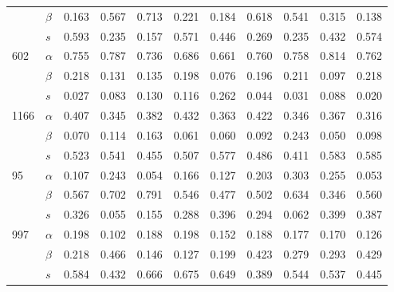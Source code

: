 \begin{longtable}{llrrrrrrrrr}
     & $\beta$ & 0.163 & 0.567 & 0.713 & 0.221 & 0.184 & 0.618 & 0.541 & 0.315 & 0.138 \\
     & $s$ & 0.593 & 0.235 & 0.157 & 0.571 & 0.446 & 0.269 & 0.235 & 0.432 & 0.574 \\
\cline{1-11}
\multirow{3}{*}{602} & $\alpha$ & 0.755 & 0.787 & 0.736 & 0.686 & 0.661 & 0.760 & 0.758 & 0.814 & 0.762 \\
     & $\beta$ & 0.218 & 0.131 & 0.135 & 0.198 & 0.076 & 0.196 & 0.211 & 0.097 & 0.218 \\
     & $s$ & 0.027 & 0.083 & 0.130 & 0.116 & 0.262 & 0.044 & 0.031 & 0.088 & 0.020 \\
\cline{1-11}
\multirow{3}{*}{1166} & $\alpha$ & 0.407 & 0.345 & 0.382 & 0.432 & 0.363 & 0.422 & 0.346 & 0.367 & 0.316 \\
     & $\beta$ & 0.070 & 0.114 & 0.163 & 0.061 & 0.060 & 0.092 & 0.243 & 0.050 & 0.098 \\
     & $s$ & 0.523 & 0.541 & 0.455 & 0.507 & 0.577 & 0.486 & 0.411 & 0.583 & 0.585 \\
\cline{1-11}
\multirow{3}{*}{95} & $\alpha$ & 0.107 & 0.243 & 0.054 & 0.166 & 0.127 & 0.203 & 0.303 & 0.255 & 0.053 \\
     & $\beta$ & 0.567 & 0.702 & 0.791 & 0.546 & 0.477 & 0.502 & 0.634 & 0.346 & 0.560 \\
     & $s$ & 0.326 & 0.055 & 0.155 & 0.288 & 0.396 & 0.294 & 0.062 & 0.399 & 0.387 \\
\cline{1-11}
\multirow{3}{*}{997} & $\alpha$ & 0.198 & 0.102 & 0.188 & 0.198 & 0.152 & 0.188 & 0.177 & 0.170 & 0.126 \\
     & $\beta$ & 0.218 & 0.466 & 0.146 & 0.127 & 0.199 & 0.423 & 0.279 & 0.293 & 0.429 \\
     & $s$ & 0.584 & 0.432 & 0.666 & 0.675 & 0.649 & 0.389 & 0.544 & 0.537 & 0.445 \\
\end{longtable}
